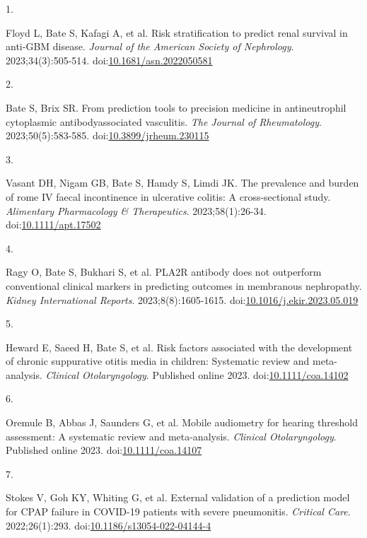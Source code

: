 \documentclass[11pt,a4paper,]{awesome-cv}
\newlength{\cslhangindent}
\newlength{\csllabelwidth}
\newenvironment{CSLReferences}[2] %
 {\begin{list}{}{%
  \setlength{\itemindent}{0pt}
  \setlength{\leftmargin}{0pt}
  \setlength{\parsep}{0pt}
  \ifodd #1
   \setlength{\leftmargin}{\cslhangindent}
   \setlength{\itemindent}{-1\cslhangindent}
  \fi
  \setlength{\itemsep}{#2\baselineskip}}}
 {\end{list}}
\newcommand{\CSLLeftMargin}[1]{\parbox[t]{\csllabelwidth}{\strut#1\strut}}
\newcommand{\CSLRightInline}[1]{\parbox[t]{\linewidth - \csllabelwidth}{\strut#1\strut}}
\begin{document}
\hypertarget{refs-cac9791246f9bada8c632813b37c6ec5}{}
\begin{CSLReferences}{0}{0}
\leavevmode{}%
\CSLLeftMargin{1. }%
\CSLRightInline{Floyd L, Bate S, Kafagi A, et al. Risk stratification to
predict renal survival in anti-GBM disease. \emph{Journal of the
American Society of Nephrology}. 2023;34(3):505-514.
doi:\href{https://doi.org/10.1681/asn.2022050581}{10.1681/asn.2022050581}}

\leavevmode{}%
\CSLLeftMargin{2. }%
\CSLRightInline{Bate S, Brix SR. From prediction tools to precision
medicine in antineutrophil cytoplasmic antibodyassociated vasculitis.
\emph{The Journal of Rheumatology}. 2023;50(5):583-585.
doi:\href{https://doi.org/10.3899/jrheum.230115}{10.3899/jrheum.230115}}

\leavevmode{}%
\CSLLeftMargin{3. }%
\CSLRightInline{Vasant DH, Nigam GB, Bate S, Hamdy S, Limdi JK. The
prevalence and burden of rome IV faecal incontinence in ulcerative
colitis: A cross-sectional study. \emph{Alimentary Pharmacology \&
Therapeutics}. 2023;58(1):26-34.
doi:\href{https://doi.org/10.1111/apt.17502}{10.1111/apt.17502}}

\leavevmode{}%
\CSLLeftMargin{4. }%
\CSLRightInline{Ragy O, Bate S, Bukhari S, et al. PLA2R antibody does
not outperform conventional clinical markers in predicting outcomes in
membranous nephropathy. \emph{Kidney International Reports}.
2023;8(8):1605-1615.
doi:\href{https://doi.org/10.1016/j.ekir.2023.05.019}{10.1016/j.ekir.2023.05.019}}

\leavevmode{}%
\CSLLeftMargin{5. }%
\CSLRightInline{Heward E, Saeed H, Bate S, et al. Risk factors
associated with the development of chronic suppurative otitis media in
children: Systematic review and meta-analysis. \emph{Clinical
Otolaryngology}. Published online 2023.
doi:\href{https://doi.org/10.1111/coa.14102}{10.1111/coa.14102}}

\leavevmode{}%
\CSLLeftMargin{6. }%
\CSLRightInline{Oremule B, Abbas J, Saunders G, et al. Mobile audiometry
for hearing threshold assessment: A systematic review and meta-analysis.
\emph{Clinical Otolaryngology}. Published online 2023.
doi:\href{https://doi.org/10.1111/coa.14107}{10.1111/coa.14107}}

\leavevmode{}%
\CSLLeftMargin{7. }%
\CSLRightInline{Stokes V, Goh KY, Whiting G, et al. External validation
of a prediction model for CPAP failure in COVID-19 patients with severe
pneumonitis. \emph{Critical Care}. 2022;26(1):293.
doi:\href{https://doi.org/10.1186/s13054-022-04144-4}{10.1186/s13054-022-04144-4}}


\end{CSLReferences}
\end{document}
